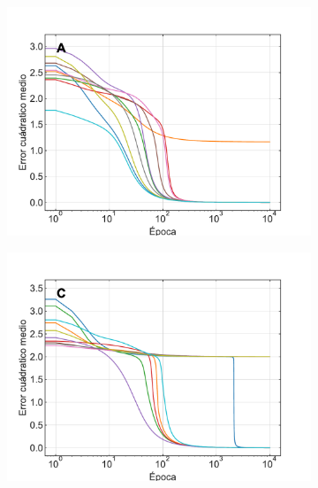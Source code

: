 \documentclass[11pt,twocolumn,twoside]{opticajnl}
\begin{document}
\begin{figure}[h]
    \centering
         \begin{subfigure}[b]{0.49\linewidth}
            \centering
            \includegraphics[width=1.1\textwidth]{Figuras/mse_ej1a.pdf}
         \end{subfigure}
         \begin{subfigure}[b]{0.49\linewidth}
            \centering
            \includegraphics[width=1.1\textwidth]{Figuras/mse_ej1b.pdf}
         \end{subfigure}
         \begin{subfigure}[b]{0.49\linewidth}
            \centering

\end{subfigure}
\end{figure}
\end{document}
